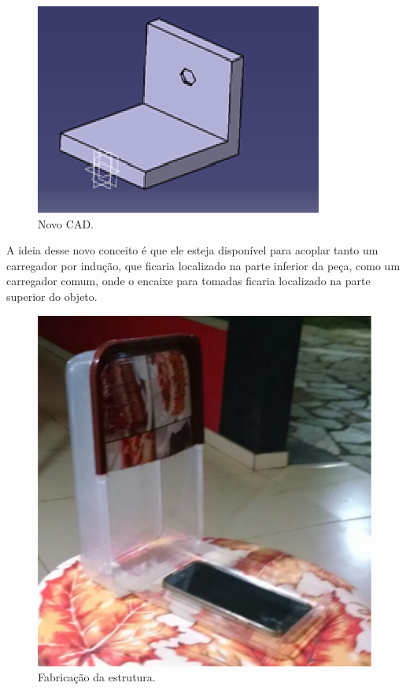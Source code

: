 \begin{itemize}
      	\begin{figure}[H]                                                           
            \centering                                                                
            \includegraphics[scale=0.8]{figuras/novocad.png}               
            \caption{Novo CAD.}    
            \label{img:novo_cad}                                            
         \end{figure}

        A ideia desse novo conceito é que ele esteja disponível para acoplar tanto um carregador por indução, que ficaria localizado na parte inferior da peça, como um carregador comum, onde o encaixe para tomadas ficaria localizado na parte superior do objeto.

        \begin{figure}[H]                                                           
            \centering                                                                
            \includegraphics[scale=0.5]{figuras/novaestrutura.png}               
            \caption{Fabricação da estrutura.}    
            \label{img:nova_estrutura}                                            
         \end{figure}


\end{itemize}
